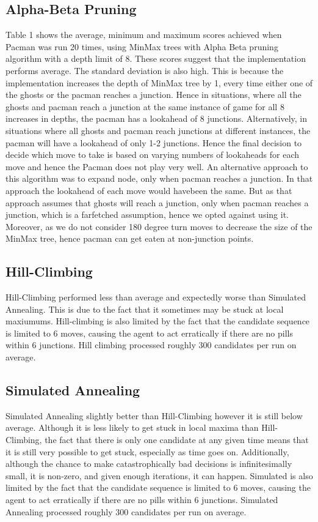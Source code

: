 \documentclass[a4paper]{article}
\begin{document}
\subsection{Alpha-Beta Pruning}
Table 1 shows the average, minimum and maximum scores achieved when Pacman was run 20 times, using MinMax trees with Alpha Beta pruning algorithm with a depth limit of 8. These scores suggest that the implementation performs average. The standard deviation is also high. This is because the implementation increases the depth of MinMax tree by 1, every time either one of the ghosts or the pacman reaches a junction. Hence in situations, where all the ghosts and pacman reach a junction at the same instance of game for all 8 increases in depths, the pacman has a lookahead of 8 junctions. Alternatively, in situations where all ghosts and pacman reach junctions at different instances, the pacman will have a lookahead of only 1-2 junctions. Hence the final decision to decide which move to take is based on varying numbers of lookaheads for each move and hence the Pacman does not play very well. An alternative approach to this algorithm was to expand node, only when pacman reaches a junction. In that approach the lookahead of each move would havebeen the same. But as that approach assumes that ghosts will reach a junction, only when pacman reaches a junction, which is a farfetched assumption, hence we opted against using it. Moreover, as we do not consider 180 degree turn moves to decrease the size of the MinMax tree, hence pacman can get eaten at non-junction points.  
\subsection{Hill-Climbing}

Hill-Climbing performed less than average and expectedly worse than Simulated Annealing. This is due to the fact that it sometimes may be stuck at local maxiumums. Hill-climbing is also limited by the fact that the candidate sequence is limited to 6 moves, causing the agent to act erratically if there are no pills within 6 junctions.  Hill climbing processed roughly 300 candidates per run on average.

\subsection{Simulated Annealing}

Simulated Annealing slightly better than Hill-Climbing however it is still below average.  Although it is less likely to get stuck in local maxima than Hill-Climbing, the fact that there is only one candidate at any given time means that it is still very possible to get stuck, especially as time goes on.  Additionally, although the chance to make catastrophically bad decisions is infinitesimally small, it is non-zero, and given enough iterations, it can happen.  Simulated is also limited by the fact that the candidate sequence is limited to 6 moves, causing the agent to act erratically if there are no pills within 6 junctions.  Simulated Annealing processed roughly 300 candidates per run on average.
\end{document}
